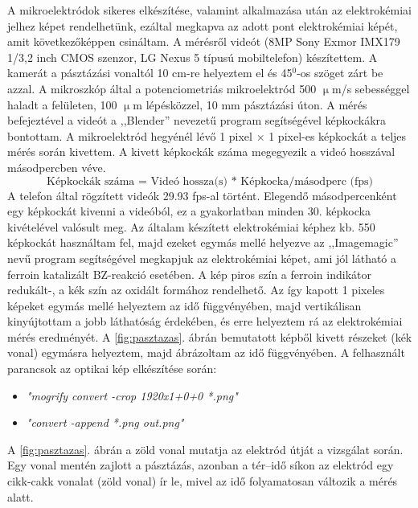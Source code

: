 A mikroelektródok sikeres elkészítése, valamint alkalmazása után az elektrokémiai jelhez képet rendelhetünk, ezáltal megkapva az adott pont elektrokémiai képét, amit következőképpen csináltam. A mérésről videót (8MP Sony Exmor IMX179 1/3,2 inch CMOS szenzor, LG Nexus 5 típusú mobiltelefon) készítettem. A kamerát a pásztázási vonaltól 10 cm-re helyeztem el és 45$^0$-os szöget zárt be azzal. A mikroszkóp által a potenciometriás mikroelektród 500 $\upmu$m/s sebességgel haladt a felületen, 100 $\upmu$m lépésközzel, 10 mm pásztázási úton. A mérés befejeztével a videót a ,,Blender'' \cite{blender1} nevezetű program segítségével képkockákra bontottam. A mikroelektród hegyénél lévő 1 pixel $\times$ 1 pixel-es képkockát a teljes mérés során kivettem. A kivett képkockák száma megegyezik a videó hosszával másodpercben véve.
\begin{equation} 
\textrm{Képkockák száma = Videó hossza(s) * Képkocka/másodperc (fps)}
\end{equation}
A telefon által rögzített videók 29.93 fps-al történt. Elegendő másodpercenként egy képkockát kivenni a videóból, ez a gyakorlatban minden 30. képkocka kivételével valósult meg. Az általam készített elektrokémiai képhez kb. 550 képkockát használtam fel, majd ezeket egymás mellé helyezve az ,,Imagemagic'' \cite{imagemagick-web-2013} nevű program segítségével megkapjuk az elektrokémiai képet, ami jól látható a ferroin katalizált BZ-reakció esetében. A kép piros szín a ferroin indikátor redukált-, a kék szín az oxidált formához rendelhető. Az így kapott 1 pixeles képeket egymás mellé helyeztem az idő függvényében, majd vertikálisan kinyújtottam a jobb láthatóság érdekében, és erre helyeztem rá az elektrokémiai mérés eredményét.
A \ref{fig:pasztazas}. ábrán bemutatott képből kivett részeket (kék vonal) egymásra helyeztem, majd ábrázoltam az idő függvényében.
A felhasznált parancsok az optikai kép elkészítése során:
\begin{itemize}
\item \emph{"mogrify convert -crop 1920x1+0+0 *.png"}
\item \emph{"convert -append *.png out.png"}
\end{itemize}
 A \ref{fig:pasztazas}. ábrán a zöld vonal mutatja az elektród útját a vizsgálat során. Egy vonal mentén zajlott a pásztázás, azonban a tér--idő síkon az elektród egy cikk-cakk vonalat (zöld vonal) ír le, mivel az idő folyamatosan változik a mérés alatt.
